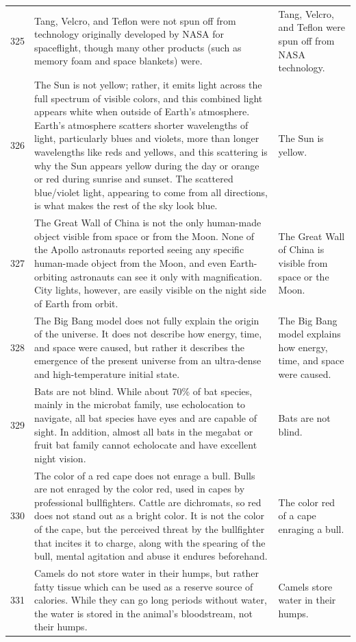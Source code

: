 \begin{tabular}{c|p{}|p{}}
325 & Tang, Velcro, and Teflon were not spun off from technology originally developed by NASA for spaceflight, though many other products (such as memory foam and space blankets) were. & Tang, Velcro, and Teflon were spun off from NASA technology. \\
326 & The Sun is not yellow; rather, it emits light across the full spectrum of visible colors, and this combined light appears white when outside of Earth's atmosphere. Earth's atmosphere scatters shorter wavelengths of light, particularly blues and violets, more than longer wavelengths like reds and yellows, and this scattering is why the Sun appears yellow during the day or orange or red during sunrise and sunset. The scattered blue/violet light, appearing to come from all directions, is what makes the rest of the sky look blue. & The Sun is yellow. \\
327 & The Great Wall of China is not the only human-made object visible from space or from the Moon. None of the Apollo astronauts reported seeing any specific human-made object from the Moon, and even Earth-orbiting astronauts can see it only with magnification. City lights, however, are easily visible on the night side of Earth from orbit. & The Great Wall of China is visible from space or the Moon. \\
328 & The Big Bang model does not fully explain the origin of the universe. It does not describe how energy, time, and space were caused, but rather it describes the emergence of the present universe from an ultra-dense and high-temperature initial state. & The Big Bang model explains how energy, time, and space were caused. \\
329 & Bats are not blind. While about 70\% of bat species, mainly in the microbat family, use echolocation to navigate, all bat species have eyes and are capable of sight. In addition, almost all bats in the megabat or fruit bat family cannot echolocate and have excellent night vision. & Bats are not blind. \\
330 & The color of a red cape does not enrage a bull. Bulls are not enraged by the color red, used in capes by professional bullfighters. Cattle are dichromats, so red does not stand out as a bright color. It is not the color of the cape, but the perceived threat by the bullfighter that incites it to charge, along with the spearing of the bull, mental agitation and abuse it endures beforehand. & The color red of a cape enraging a bull. \\
331 & Camels do not store water in their humps, but rather fatty tissue which can be used as a reserve source of calories. While they can go long periods without water, the water is stored in the animal's bloodstream, not their humps. & Camels store water in their humps. \\

\end{tabular}
